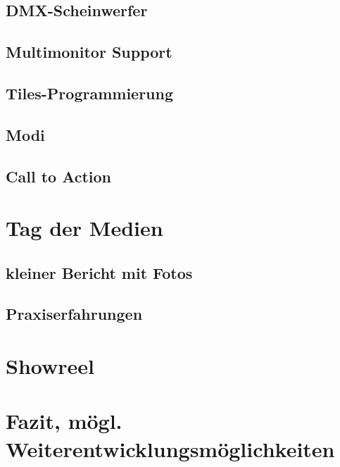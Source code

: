 \subsection{DMX-Scheinwerfer}
\subsection{Multimonitor Support}
\subsection{Tiles-Programmierung}
\subsection{Modi}
\subsection{Call to Action}



\section{Tag der Medien}
\subsection{kleiner Bericht mit Fotos}
\subsection{Praxiserfahrungen}

\section{Showreel}
\section{Fazit, mögl. Weiterentwicklungsmöglichkeiten}

